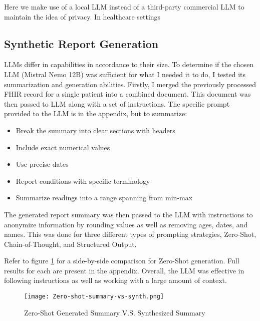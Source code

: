 Here we make use of a local LLM instead of a third-party commercial LLM to maintain the idea of privacy. In healthcare settings
\subsection{Synthetic Report Generation}
LLMs differ in capabilities in accordance to their size.
To determine if the chosen LLM (Mistral Nemo 12B) was sufficient for what I needed it to do, I tested its summarization and generation abilities.
Firstly, I merged the previously processed FHIR record for a single patient into a combined document.
This document was then passed to LLM along with a set of instructions.
The specific prompt provided to the LLM is in the appendix, but to summarize:
\begin{itemize}
	\item Break the summary into clear sections with headers
	\item Include exact numerical values
	\item Use precise dates
	\item Report conditions with specific terminology
	\item Summarize readings into a range spanning from min-max
\end{itemize}

The generated report summary was then passed to the LLM with instructions to anonymize information by rounding values as well as removing ages, dates, and names.
This was done for three different types of prompting strategies, Zero-Shot, Chain-of-Thought, and Structured Output.

Refer to figure \ref{fig:SynthSummary} for a side-by-side comparison for Zero-Shot generation.
Full results for each are present in the appendix.
Overall, the LLM was effective in following instructions as well as working with a large amount of context.

\begin{figure}
	\texttt{[image: Zero-shot-summary-vs-synth.png]}
	\centering
	\caption{Zero-Shot Generated Summary V.S. Synthesized Summary}
	\label{fig:SynthSummary}
\end{figure}
